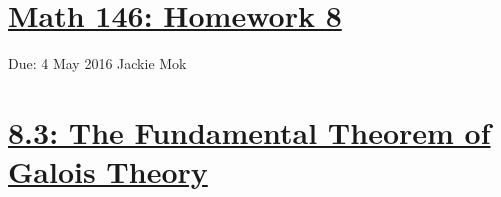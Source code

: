 \documentclass{article}
\begin{document}
\section*{\underline{Math 146: Homework 8}}
Due: 4 May 2016
\newline Jackie Mok

\section*{\underline{8.3: The Fundamental Theorem of Galois Theory}}



\end{document}
